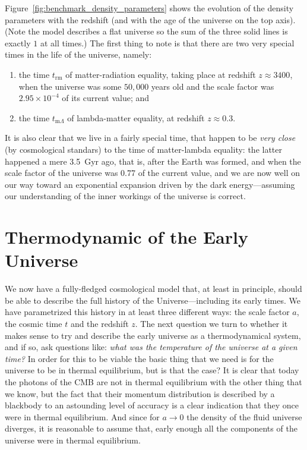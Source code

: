 Figure~\ref{fig:benchmark_density_parameters} shows the evolution of the density
parameters with the redshift (and with the age of the universe on the top axis).
(Note the model describes a flat universe so the sum of the three solid lines is
exactly $1$ at all times.) The first thing to note is that there are two very special
times in the life of the universe, namely:
\begin{enumerate}
  \item the time $t_\text{rm}$ of matter-radiation equality, taking place at redshift
  $z \approx 3400$, when the universe was some $50,000$ years old and the scale
  factor was $2.95 \times 10^{-4}$ of its current value; and
  \item the time $t_{\text{m}\Lambda}$ of lambda-matter equality, at redshift
  $z \approx 0.3$.
\end{enumerate}
It is also clear that we live in a fairly special time, that happen to be \emph{very close}
(by cosmological standars) to the time of matter-lambda equality: the latter happened
a mere 3.5~Gyr ago, that is, after the Earth was formed, and when the scale factor
of the universe was 0.77 of the current value, and we are now well on our way
toward an exponential expansion driven by the dark energy---assuming our understanding
of the inner workings of the universe is correct.



\section{Thermodynamic of the Early Universe}

We now have a fully-fledged cosmological model that, at least in principle, should
be able to describe the full history of the Universe---including its early times.
We have parametrized this history in at least three different ways: the scale factor $a$,
the cosmic time $t$ and the redshift $z$. The next question we turn to whether it makes
sense to try and describe the early universe as a thermodynamical system, and if so,
ask questions like: \emph{what was the temperature of the universe at a given time?}
In order for this to be viable the basic thing that we need is for the universe to
be in thermal equilibrium, but is that the case? It is clear that today the photons
of the CMB are not in thermal equilibrium with the other thing that we know, but the fact that their momentum distribution is
described by a blackbody to an astounding level of accuracy is a clear indication that they
once were in thermal equilibrium. And since for $a \rightarrow 0$ the density of the
fluid universe diverges, it is reasonable to assume that, early enough all the components
of the universe were in thermal equilibrium.

